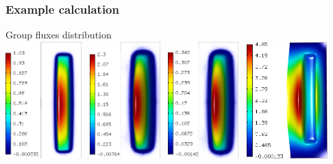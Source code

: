 \begin{frame}[t]
  \frametitle{Example calculation}
  \vspace*{-.3cm}
  \centering\textcolor{structure.bg!95!blue}{ Group fluxes distribution }\\[3em]
    \hspace*{-.6cm}
  \includegraphics[height=4.5cm]{images/Hermes/hp1/screen001.png}~
  \includegraphics[height=4.5cm]{images/Hermes/hp1/screen002.png}~
  \includegraphics[height=4.5cm]{images/Hermes/hp1/screen003.png}~
  \includegraphics[height=4.5cm]{images/Hermes/hp1/screen004.png}
\end{frame}

